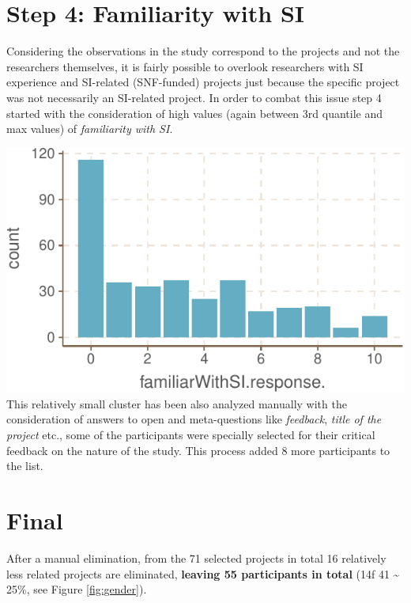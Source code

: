 \documentclass[]{tufte-book}
\begin{document}
\hypertarget{step-4-familiarity-with-si}{%
\section{Step 4: Familiarity with SI}\label{step-4-familiarity-with-si}}

Considering the observations in the study correspond to the projects and
not the researchers themselves, it is fairly possible to overlook
researchers with SI experience and SI-related (SNF-funded) projects just
because the specific project was not necessarily an SI-related project.
In order to combat this issue step 4 started with the consideration of
high values (again between 3rd quantile and max values) of
\emph{familiarity with SI}.

\includegraphics{SIVOCS_int-cand_files/figure-latex/step4-1} This
relatively small cluster has been also analyzed manually with the
consideration of answers to open and meta-questions like
\emph{feedback}, \emph{title of the project} etc., some of the
participants were specially selected for their critical feedback on the
nature of the study. This process added 8 more participants to the list.

\hypertarget{final}{%
\section{Final}\label{final}}

After a manual elimination, from the 71 selected projects in total 16
relatively less related projects are eliminated, \textbf{leaving 55
participants in total} (14f \textbar{} 41 \textasciitilde{} 25\%, see
Figure \ref{fig:gender}).
\end{document}
